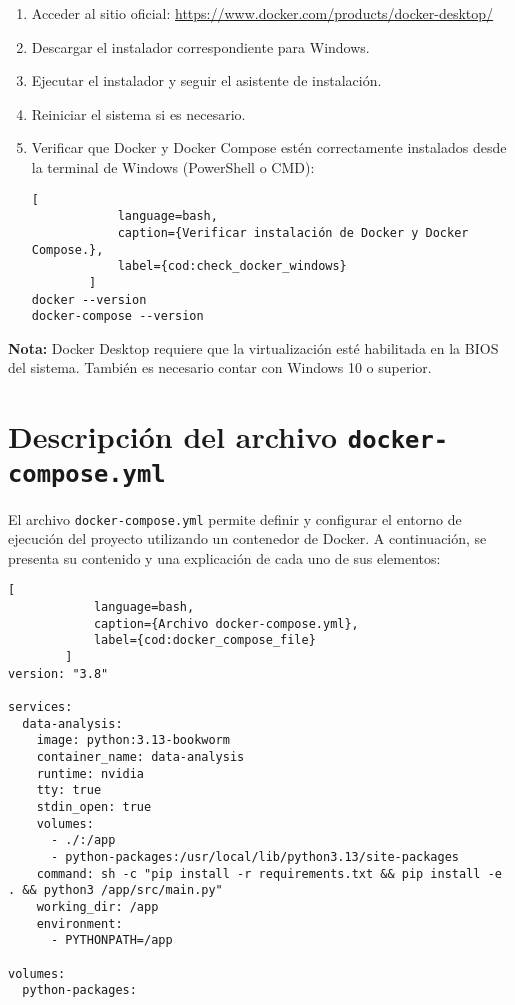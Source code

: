 \begin{enumerate}
    \item Acceder al sitio oficial: \href{https://www.docker.com/products/docker-desktop/}{https://www.docker.com/products/docker-desktop/}
    
    \item Descargar el instalador correspondiente para Windows.

    \item Ejecutar el instalador y seguir el asistente de instalación.

    \item Reiniciar el sistema si es necesario.

    \item Verificar que Docker y Docker Compose estén correctamente instalados desde la terminal de Windows (PowerShell o CMD):
    \begin{lstlisting}[
			language=bash,
			caption={Verificar instalación de Docker y Docker Compose.},
			label={cod:check_docker_windows}
		]
docker --version
docker-compose --version
    \end{lstlisting}
\end{enumerate}

\textbf{Nota:} Docker Desktop requiere que la virtualización esté habilitada en la BIOS del sistema. También es necesario contar con Windows 10 o superior.

\section{Descripción del archivo \texttt{docker-compose.yml}}
El archivo \texttt{docker-compose.yml} permite definir y configurar el entorno de ejecución del proyecto utilizando un contenedor de Docker. A continuación, se presenta su contenido y una explicación de cada uno de sus elementos:

\vspace{3mm}
\begin{lstlisting}[
			language=bash,
			caption={Archivo docker-compose.yml},
			label={cod:docker_compose_file}
		]
version: "3.8"

services:
  data-analysis:
    image: python:3.13-bookworm
    container_name: data-analysis
    runtime: nvidia
    tty: true
    stdin_open: true
    volumes:
      - ./:/app
      - python-packages:/usr/local/lib/python3.13/site-packages
    command: sh -c "pip install -r requirements.txt && pip install -e . && python3 /app/src/main.py"
    working_dir: /app
    environment:
      - PYTHONPATH=/app

volumes:
  python-packages:
\end{lstlisting}

